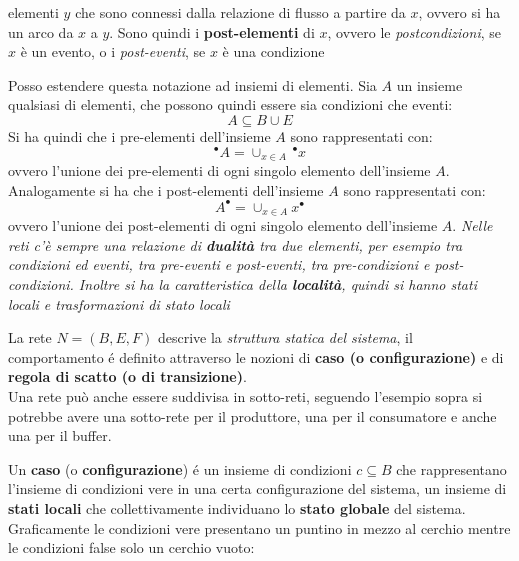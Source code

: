 \documentclass[a4paper,12pt, oneside]{book}
\begin{document}
\begin{definizione}
\begin{itemize}
    elementi $y$ che sono connessi dalla relazione di flusso a partire da $x$,
    ovvero si ha un arco da $x$ a $y$. Sono quindi i \textbf{post-elementi} di
    $x$, ovvero le \textit{postcondizioni}, se $x$ è un evento, o i
    \textit{post-eventi}, se $x$ è una condizione
  \end{itemize}
  Posso estendere questa notazione ad insiemi di elementi. Sia $A$ un insieme
  qualsiasi di elementi, che possono quindi essere sia condizioni che eventi:
  \[A\subseteq B\cup E\]
  Si ha quindi che i pre-elementi dell'insieme $A$ sono rappresentati con:
  \[^\bullet A=\cup_{x\in A}\, ^\bullet x\]
  ovvero l'unione dei pre-elementi di ogni singolo elemento dell'insieme $A$.\\
  Analogamente si ha che i post-elementi dell'insieme $A$ sono rappresentati
  con: 
  \[A^\bullet=\cup_{x\in A} x^\bullet\]
  ovvero l'unione dei post-elementi di ogni singolo elemento dell'insieme $A$.
  \textit{Nelle reti c'è sempre una relazione di \textbf{dualità} tra due
    elementi, per esempio tra condizioni ed eventi, tra pre-eventi e
    post-eventi, tra pre-condizioni e post-condizioni. Inoltre si ha la
    caratteristica della \textbf{località}, quindi si hanno stati locali e
    trasformazioni di stato locali} 
\end{definizione}
La rete $N=(B,E,F)$ descrive la \textit{struttura statica del sistema}, il
comportamento é definito attraverso le nozioni di \textbf{caso (o
  configurazione)} e di \textbf{regola di scatto (o di transizione)}.\\
Una rete può anche essere suddivisa in sotto-reti, seguendo l'esempio sopra si
potrebbe avere una sotto-rete per il produttore, una per il consumatore e anche
una per il buffer.\\
\begin{definizione}
  Un \textbf{caso} (o \textbf{configurazione}) é un insieme di condizioni
  $c\subseteq B$ che rappresentano l’insieme di condizioni vere in una certa
  configurazione del sistema, un insieme di \textbf{stati locali} che
  collettivamente individuano lo \textbf{stato globale} del sistema.\\
  Graficamente le condizioni vere presentano un puntino in mezzo al cerchio
  mentre le condizioni false solo un cerchio vuoto:
  \begin{center}
  \end{center}
\end{definizione}
\end{document}
